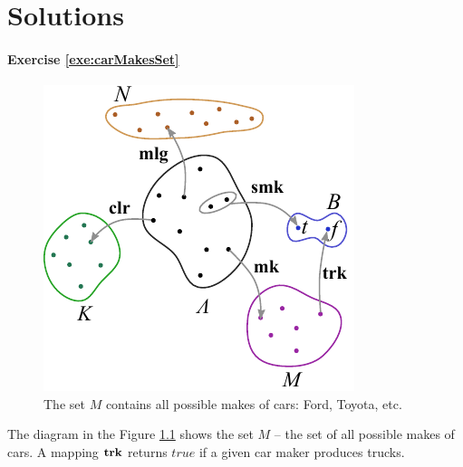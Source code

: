 \graphicspath{{../09Solutions/pics/}}

\chapter{Solutions}\label{ch:Solutions}
\footnotesize

\subsubsection*{Exercise \ref{exe:carMakesSet}}

\begin{figure}[htbp]
  \centering
  \includegraphics[scale=1.0]{diagramCars}
  \caption{The set $M$ contains all possible makes of cars: Ford,
    Toyota, etc.}
  \label{fig:diagramCars}
\end{figure}

The diagram in the Figure \ref{fig:diagramCars} shows the set $M$ -- the set
of all possible makes of cars. A mapping $\textrm{\bf {trk}}$ returns $true$ if a
given car maker produces trucks.

